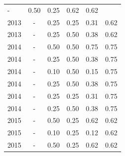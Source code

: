\begin{table}[H]
\begin{tabular}{| l | c | c | c | c | c |}
          -
          &
          0.50
          &
          0.25
          &
          0.62
          &
            {\color{blue} 0.62}
          \\
            2013
          &
          -
          &
          0.25
          &
          0.25
          &
          0.31
          &
            {\color{blue} 0.62}
          \\
            2013
          &
          -
          &
          0.25
          &
          0.50
          &
          0.38
          &
            {\color{blue} 0.62}
          \\
\hline
            2014
          &
          -
          &
          0.50
          &
          0.50
          &
          0.75
          &
            {\color{blue} 0.75}
          \\
            2014
          &
          -
          &
          0.25
          &
          0.50
          &
          0.38
          &
            {\color{blue} 0.75}
          \\
            2014
          &
          -
          &
          0.10
          &
          0.50
          &
          0.15
          &
            {\color{blue} 0.75}
          \\
            2014
          &
          -
          &
          0.25
          &
          0.50
          &
          0.38
          &
            {\color{blue} 0.75}
          \\
            2014
          &
          -
          &
          0.25
          &
          0.25
          &
          0.31
          &
            {\color{blue} 0.75}
          \\
            2014
          &
          -
          &
          0.25
          &
          0.50
          &
          0.38
          &
            {\color{blue} 0.75}
          \\
\hline
            2015
          &
          -
          &
          0.50
          &
          0.25
          &
          0.62
          &
            {\color{blue} 0.62}
          \\
            2015
          &
          -
          &
          0.10
          &
          0.25
          &
          0.12
          &
            {\color{blue} 0.62}
          \\
            2015
          &
          -
          &
          0.50
          &
          0.25
          &
          0.62
          &
            {\color{blue} 0.62}
          \\

\end{tabular}
\end{table}
